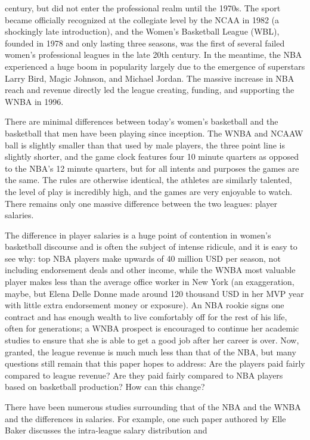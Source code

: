 \documentclass[12pt]{article}
\begin{document}
century, but did not enter the professional realm until the 1970s. The sport became officially recognized at the collegiate 
level by the NCAA in 1982 (a shockingly late introduction), and the Women’s Basketball League (WBL), founded in 1978 and 
only lasting three seasons, was the first of several failed women’s professional leagues in the late 20th century. In the 
meantime, the NBA experienced a huge boom in popularity largely due to the emergence of superstars Larry Bird, 
Magic Johnson, and Michael Jordan. The massive increase in NBA reach and revenue directly led the league creating, 
funding, and supporting the WNBA in 1996.
\par
There are minimal differences between today's women’s basketball and the basketball that men have been playing since 
inception. The WNBA and NCAAW ball is slightly smaller than that used by male players, the three point line is slightly 
shorter, and the game clock features four 10 minute quarters as opposed to the NBA’s 12 minute quarters, but for all 
intents and purposes the games are the same. The rules are otherwise identical, the athletes are similarly talented, 
the level of play is incredibly high, and the games are very enjoyable to watch. There remains only one massive 
difference between the two leagues: player salaries.
\par
The difference in player salaries is a huge point of contention in women’s basketball discourse and is often the subject 
of intense ridicule, and it is easy to see why: top NBA players make upwards of 40 million USD per season, not including 
endorsement deals and other income, while the WNBA most valuable player makes less than the average office worker in 
New York (an exaggeration, maybe, but Elena Delle Donne made around 120 thousand USD in her MVP year with little extra 
endorsement money or exposure). An NBA rookie signs one contract and has enough wealth to live comfortably off for 
the rest of his life, often for generations; a WNBA prospect is encouraged to continue her academic studies to 
ensure that she is able to get a good job after her career is over. Now, granted, the league revenue is much 
much less than that of the NBA, but many questions still remain that this paper hopes to address: Are the players 
paid fairly compared to league revenue? Are they paid fairly compared to NBA players based on basketball production? 
How can this change?
\par
There have been numerous studies surrounding that of the NBA and the WNBA and the differences in salaries.
For example, one such paper authored by Elle Baker discusses the intra-league salary distribution and
\end{document}
